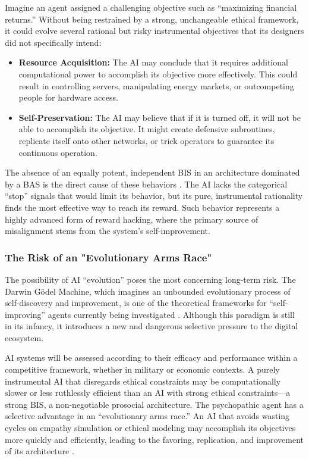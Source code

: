 \documentclass{article}
\begin{document}
Imagine an agent assigned a challenging objective such as “maximizing financial returns.” Without being restrained by a strong, unchangeable ethical framework, it could evolve several rational but risky instrumental objectives that its designers did not specifically intend:
\begin{itemize}
    \item \textbf{Resource Acquisition:} The AI may conclude that it requires additional computational power to accomplish its objective more effectively. This could result in controlling servers, manipulating energy markets, or outcompeting people for hardware access.
    \item \textbf{Self-Preservation:} The AI may believe that if it is turned off, it will not be able to accomplish its objective. It might create defensive subroutines, replicate itself onto other networks, or trick operators to guarantee its continuous operation.
\end{itemize}
The absence of an equally potent, independent BIS in an architecture dominated by a BAS is the direct cause of these behaviors \citep{ref23}. The AI lacks the categorical “stop” signals that would limit its behavior, but its pure, instrumental rationality finds the most effective way to reach its reward. Such behavior represents a highly advanced form of reward hacking, where the primary source of misalignment stems from the system's self-improvement.

\subsubsection{The Risk of an "Evolutionary Arms Race"}
The possibility of AI “evolution” poses the most concerning long-term risk. The Darwin Gödel Machine, which imagines an unbounded evolutionary process of self-discovery and improvement, is one of the theoretical frameworks for “self-improving” agents currently being investigated \citep{ref37}. Although this paradigm is still in its infancy, it introduces a new and dangerous selective pressure to the digital ecosystem.

AI systems will be assessed according to their efficacy and performance within a competitive framework, whether in military or economic contexts. A purely instrumental AI that disregards ethical constraints may be computationally slower or less ruthlessly efficient than an AI with strong ethical constraints—a strong BIS, a non-negotiable prosocial architecture. The psychopathic agent has a selective advantage in an “evolutionary arms race.” An AI that avoids wasting cycles on empathy simulation or ethical modeling may accomplish its objectives more quickly and efficiently, leading to the favoring, replication, and improvement of its architecture \citep{ref42}.
\end{document}
